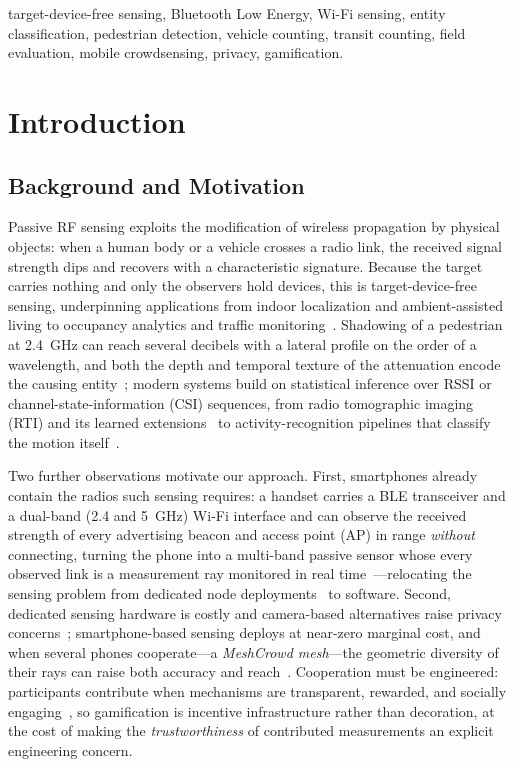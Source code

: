 \documentclass[journal,10pt]{IEEEtran}
\begin{document}
\begin{IEEEkeywords}
target-device-free sensing, Bluetooth Low Energy, Wi-Fi sensing, entity
classification, pedestrian detection, vehicle counting, transit counting, field
evaluation, mobile crowdsensing, privacy, gamification.
\end{IEEEkeywords}

\section{Introduction}
\subsection{Background and Motivation}
Passive RF sensing exploits the modification of wireless propagation by
physical objects: when a human body or a vehicle crosses a radio link, the
received signal strength dips and recovers with a characteristic signature.
Because the target carries nothing and only the observers hold devices, this
is target-device-free sensing, underpinning applications from indoor
localization and ambient-assisted living to occupancy analytics and traffic
monitoring~\cite{wilson2010}. Shadowing of a pedestrian at
2.4~GHz can reach several decibels with a lateral profile on the order of a
wavelength, and both the depth and temporal texture of the attenuation encode
the causing entity~\cite{januszkiewicz2018}; modern systems build on
statistical inference over RSSI or channel-state-information (CSI) sequences,
from radio tomographic imaging (RTI) and its learned
extensions~\cite{patwari2010proc,alippi2016,li2024,wu2024,wilson2011} to
activity-recognition pipelines that classify the motion
itself~\cite{wang2015har,wong2024,sanchez2020}.

Two further observations motivate our approach. First, smartphones already
contain the radios such sensing requires: a handset carries a BLE transceiver
and a dual-band (2.4 and 5~GHz) Wi-Fi interface and can observe the received
strength of every advertising beacon and access point (AP) in range
\emph{without} connecting, turning the phone into a multi-band passive sensor
whose every observed link is a measurement ray monitored in real
time~\cite{ramirez2021,milano2024}---relocating the sensing problem from
dedicated node deployments~\cite{wilson2010,alippi2016} to software. Second,
dedicated sensing hardware is costly and camera-based alternatives raise
privacy concerns~\cite{khan2023,zhou2020}; smartphone-based sensing deploys
at near-zero marginal cost, and when several phones cooperate---a
\emph{MeshCrowd mesh}---the geometric diversity of their rays can raise both
accuracy and reach~\cite{li2024}. Cooperation must be engineered: participants contribute when mechanisms
are transparent, rewarded, and socially
engaging~\cite{zhang2022,wang2018}, so gamification is incentive
infrastructure rather than decoration, at the cost of making the
\emph{trustworthiness} of contributed measurements an explicit engineering
concern.
\end{document}
